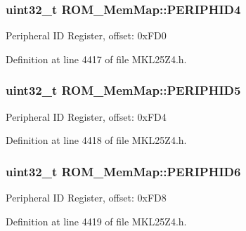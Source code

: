 \subsubsection[{\texorpdfstring{P\+E\+R\+I\+P\+H\+I\+D4}{PERIPHID4}}]{\setlength{\rightskip}{0pt plus 5cm}uint32\+\_\+t R\+O\+M\+\_\+\+Mem\+Map\+::\+P\+E\+R\+I\+P\+H\+I\+D4}\hypertarget{struct_r_o_m___mem_map_a77e302caa85d43fc41bb379c67bb2d29}{}\label{struct_r_o_m___mem_map_a77e302caa85d43fc41bb379c67bb2d29}
Peripheral ID Register, offset\+: 0x\+F\+D0 

Definition at line 4417 of file M\+K\+L25\+Z4.\+h.

\subsubsection[{\texorpdfstring{P\+E\+R\+I\+P\+H\+I\+D5}{PERIPHID5}}]{\setlength{\rightskip}{0pt plus 5cm}uint32\+\_\+t R\+O\+M\+\_\+\+Mem\+Map\+::\+P\+E\+R\+I\+P\+H\+I\+D5}\hypertarget{struct_r_o_m___mem_map_a136c3c65e70983bdce4538ed35668d26}{}\label{struct_r_o_m___mem_map_a136c3c65e70983bdce4538ed35668d26}
Peripheral ID Register, offset\+: 0x\+F\+D4 

Definition at line 4418 of file M\+K\+L25\+Z4.\+h.

\subsubsection[{\texorpdfstring{P\+E\+R\+I\+P\+H\+I\+D6}{PERIPHID6}}]{\setlength{\rightskip}{0pt plus 5cm}uint32\+\_\+t R\+O\+M\+\_\+\+Mem\+Map\+::\+P\+E\+R\+I\+P\+H\+I\+D6}\hypertarget{struct_r_o_m___mem_map_a649df8358a45f63eb1c5322beee352f7}{}\label{struct_r_o_m___mem_map_a649df8358a45f63eb1c5322beee352f7}
Peripheral ID Register, offset\+: 0x\+F\+D8 

Definition at line 4419 of file M\+K\+L25\+Z4.\+h.

